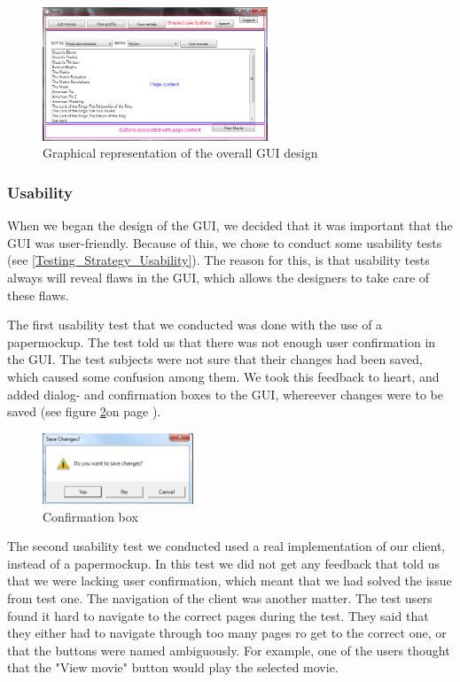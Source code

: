 \begin{figure}[h!]
  \centering
\includegraphics[width=0.60\textwidth]{Parts/Images/Design/GUIDesign}
\caption{Graphical representation of the overall GUI design}
\label{fig:Design_Client_GUI_Usability_design}
\end{figure}

\subsubsection{Usability}
\label{Design_Client_GUI_Usability}
When we began the design of the GUI, we decided that it was important that the GUI was user-friendly. Because of this, we chose to conduct some usability tests (see \ref{Testing_Strategy_Usability}). The reason for this, is that usability tests always will reveal flaws in the GUI, which allows the designers to take care of these flaws. 

The first usability test that we conducted was done with the use of a papermockup. The test told us that there was not enough user confirmation in the GUI. The test subjects were not sure that their changes had been saved, which caused some confusion among them. We took this feedback to heart, and added dialog- and confirmation boxes to the GUI, whereever changes were to be saved (see figure \ref{fig:Design_Client_GUI_Usability_popup}on page \pageref{fig:Design_Client_GUI_Usability_popup}).

\begin{figure}[h!]
  \centering
\includegraphics[width=0.4\textwidth]{Parts/Images/Design/Confirmationbox}
\caption{Confirmation box}
\label{fig:Design_Client_GUI_Usability_popup}
\end{figure}

The second usability test we conducted used a real implementation of our client, instead of a papermockup. In this test we did not get any feedback that told us that we were lacking user confirmation, which meant that we had solved the issue from test one. The navigation of the client was another matter. The test users found it hard to navigate to the correct pages during the test. They said that they either had to navigate through too many pages ro get to the correct one, or that the buttons were named ambiguously.  For example, one of the users thought that the "View movie" button would play the selected movie.

